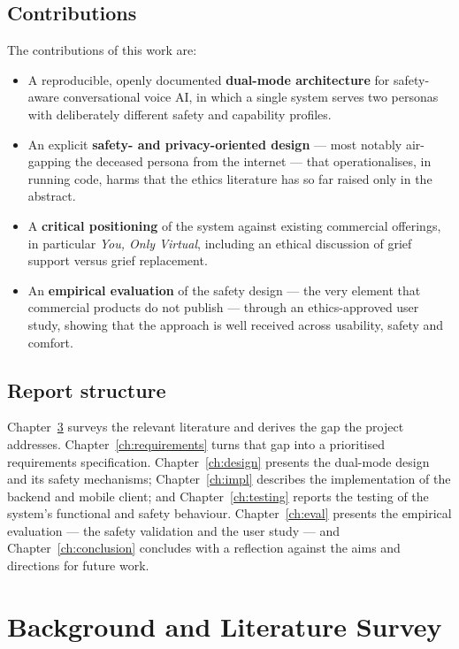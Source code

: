 \documentclass[11pt,a4paper]{report}
\begin{document}
\section{Contributions}
The contributions of this work are:
\begin{itemize}[itemsep=2pt]
  \item A reproducible, openly documented \textbf{dual-mode architecture} for safety-aware conversational voice AI, in which a single system serves two personas with deliberately different safety and capability profiles.
  \item An explicit \textbf{safety- and privacy-oriented design} --- most notably air-gapping the deceased persona from the internet --- that operationalises, in running code, harms that the ethics literature has so far raised only in the abstract.
  \item A \textbf{critical positioning} of the system against existing commercial offerings, in particular \emph{You, Only Virtual}, including an ethical discussion of grief support versus grief replacement.
  \item An \textbf{empirical evaluation} of the safety design --- the very element that commercial products do not publish --- through an ethics-approved user study, showing that the approach is well received across usability, safety and comfort.
\end{itemize}

\section{Report structure}
Chapter~\ref{ch:background} surveys the relevant literature and derives the gap the project addresses. Chapter~\ref{ch:requirements} turns that gap into a prioritised requirements specification. Chapter~\ref{ch:design} presents the dual-mode design and its safety mechanisms; Chapter~\ref{ch:impl} describes the implementation of the backend and mobile client; and Chapter~\ref{ch:testing} reports the testing of the system's functional and safety behaviour. Chapter~\ref{ch:eval} presents the empirical evaluation --- the safety validation and the user study --- and Chapter~\ref{ch:conclusion} concludes with a reflection against the aims and directions for future work.

\chapter{Background and Literature Survey}
\label{ch:background}
\label{ch:lit}
\end{document}
